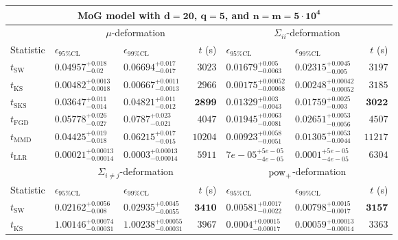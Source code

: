 \begin{tabular}{l|llr|llr}
	\toprule
	\multicolumn{7}{c}{{\bf MoG model with $\mathbf{d=20}$, $\mathbf{q=5}$, and $\mathbf{n=m=5\cdot 10^{4}}$}} \\
	\toprule
	\multicolumn{1}{c}{} & \multicolumn{3}{c}{$\mu$-deformation} & \multicolumn{3}{c}{$\Sigma_{ii}$-deformation} \\
	Statistic & $\epsilon_{95\%\mathrm{CL}}$ & $\epsilon_{99\%\mathrm{CL}}$ & $t$ (s) & $\epsilon_{95\%\mathrm{CL}}$ & $\epsilon_{99\%\mathrm{CL}}$ & $t$ (s) \\
	\midrule
	$t_{\mathrm{SW}}$ & $0.04957_{-0.02}^{+0.018}$ & $0.06694_{-0.017}^{+0.017}$ & $3023$ & $0.01679_{-0.0063}^{+0.005}$ & $0.02315_{-0.005}^{+0.0045}$ & $3197$ \\
	$t_{\overline{\mathrm{KS}}}$ & ${\mathbf{0.00482_{-0.0018}^{+0.0013}}}$ & ${\mathbf{0.00667_{-0.0013}^{+0.0011}}}$ & $2966$ & ${\mathbf{0.00175_{-0.00068}^{+0.00052}}}$ & ${\mathbf{0.00248_{-0.00052}^{+0.00042}}}$ & $3185$ \\
	$t_{\mathrm{SKS}}$ & $0.03647_{-0.014}^{+0.011}$ & $0.04821_{-0.012}^{+0.011}$ & ${\mathbf{2899}}$ & $0.01329_{-0.0043}^{+0.003}$ & $0.01759_{-0.003}^{+0.0025}$ & ${\mathbf{3022}}$ \\
	$t_{\mathrm{FGD}}$ & $0.05778_{-0.027}^{+0.026}$ & $0.0787_{-0.021}^{+0.023}$ & $4047$ & $0.01945_{-0.0081}^{+0.0063}$ & $0.02651_{-0.0056}^{+0.0053}$ & $4507$ \\
	$t_{\mathrm{MMD}}$ & $0.04425_{-0.018}^{+0.019}$ & $0.06215_{-0.015}^{+0.017}$ & $10204$ & $0.00923_{-0.0051}^{+0.0058}$ & $0.01305_{-0.0044}^{+0.0053}$ & $11217$ \\
	$t_{\mathrm{LLR}}$ & $0.00021_{-0.00014}^{+0.00013}$ & $0.0003_{-0.00014}^{+0.00013}$ & $5911$ & $7e-05_{-4e-05}^{+5e-05}$ & $0.0001_{-4e-05}^{+5e-05}$ & $6304$ \\
	\toprule
	\multicolumn{1}{c}{} & \multicolumn{3}{c}{$\Sigma_{i\neq j}$-deformation} & \multicolumn{3}{c}{$\rm{pow}_{+}$-deformation} \\
	Statistic & $\epsilon_{95\%\mathrm{CL}}$ & $\epsilon_{99\%\mathrm{CL}}$ & $t$ (s) & $\epsilon_{95\%\mathrm{CL}}$ & $\epsilon_{99\%\mathrm{CL}}$ & $t$ (s) \\
	\midrule
	$t_{\mathrm{SW}}$ & $0.02162_{-0.008}^{+0.0056}$ & $0.02935_{-0.0055}^{+0.0045}$ & ${\mathbf{3410}}$ & $0.00581_{-0.0022}^{+0.0017}$ & $0.00798_{-0.0017}^{+0.0015}$ & ${\mathbf{3157}}$ \\
	$t_{\overline{\mathrm{KS}}}$ & $1.00146_{-0.00031}^{+0.00074}$ & $1.00238_{-0.00031}^{+0.00055}$ & $3967$ & ${\mathbf{0.0004_{-0.00017}^{+0.00015}}}$ & ${\mathbf{0.00059_{-0.00014}^{+0.00013}}}$ & $3363$ \\

\end{tabular}
